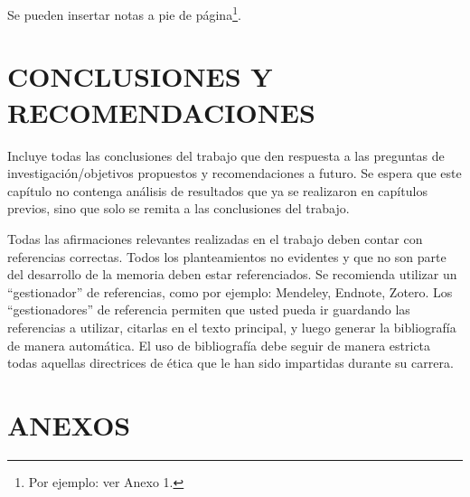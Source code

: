 \documentclass[12pt,oneside]{report}
\begin{document}
Se pueden insertar notas a pie de página\footnote{Por ejemplo: ver Anexo 1.}.

\chapter{CONCLUSIONES Y RECOMENDACIONES}
Incluye todas las conclusiones del trabajo que den respuesta a las preguntas de investigación/objetivos propuestos y recomendaciones a futuro. Se espera que este capítulo no contenga análisis de resultados que ya se realizaron en capítulos previos, sino que solo se remita a las conclusiones del trabajo.



\nocite{*}
\printbibliography[title={BIBLIOGRAFÍA}]

Todas las afirmaciones relevantes realizadas en el trabajo deben contar con referencias correctas.
Todos los planteamientos no evidentes y que no son parte del desarrollo de la memoria deben
estar referenciados. Se recomienda utilizar un “gestionador” de referencias, como por ejemplo: Mendeley, Endnote, Zotero. Los “gestionadores” de referencia
permiten que usted pueda ir guardando las referencias a utilizar, citarlas en el texto principal, y
luego generar la bibliografía de manera automática. El uso de bibliografía debe seguir de manera estricta todas aquellas directrices de ética que le han sido impartidas durante su carrera.


\chapter*{ANEXOS}
\end{document}
